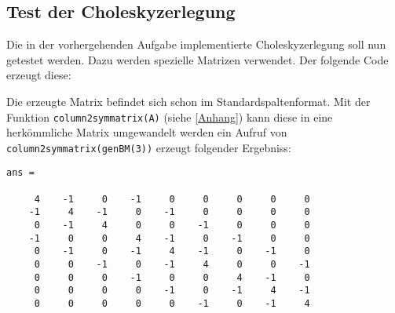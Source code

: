\subsection{Test der Choleskyzerlegung}
Die in der vorhergehenden Aufgabe implementierte Choleskyzerlegung soll nun getestet werden.
Dazu werden spezielle Matrizen verwendet. Der folgende Code erzeugt diese:

Die erzeugte Matrix befindet sich schon im Standardspaltenformat. Mit der Funktion 
{\tt column2symmatrix(A)} (siehe \ref{Anhang}) kann diese in eine herkömmliche Matrix 
umgewandelt werden ein Aufruf von {\tt column2symmatrix(genBM(3))} erzeugt folgender Ergebniss:
\begin{verbatim}
ans =

     4    -1     0    -1     0     0     0     0     0
    -1     4    -1     0    -1     0     0     0     0
     0    -1     4     0     0    -1     0     0     0
    -1     0     0     4    -1     0    -1     0     0
     0    -1     0    -1     4    -1     0    -1     0
     0     0    -1     0    -1     4     0     0    -1
     0     0     0    -1     0     0     4    -1     0
     0     0     0     0    -1     0    -1     4    -1
     0     0     0     0     0    -1     0    -1     4
\end{verbatim}
